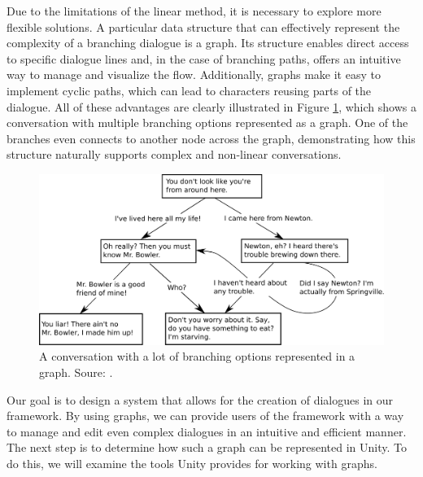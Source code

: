 Due to the limitations of the linear method, it is necessary to explore more flexible solutions. A particular data structure that can effectively represent the complexity of a branching dialogue is a graph. Its structure enables direct access to specific dialogue lines and, in the case of branching paths, offers an intuitive way to manage and visualize the flow. Additionally, graphs make it easy to implement cyclic paths, which can lead to characters reusing parts of the dialogue. All of these advantages are clearly illustrated in Figure \ref{fig:DialogueGraph}, which shows a conversation with multiple branching options represented as a graph. One of the branches even connects to another node across the graph, demonstrating how this structure naturally supports complex and non-linear conversations.

\begin{figure}[H]
\centering
\includegraphics[width=.8\linewidth]{img/image_2025-06-02_133436738.png}
\caption{A conversation with a lot of branching options represented in a graph. Soure: \cite{wiki:DialogueGraph}.}
\label{fig:DialogueGraph}
\end{figure}

Our goal is to design a system that allows for the creation of dialogues in our framework. By using graphs, we can provide users of the framework with a way to manage and edit even complex dialogues in an intuitive and efficient manner. The next step is to determine how such a graph can be represented in Unity. To do this, we will examine the tools Unity provides for working with graphs. 


